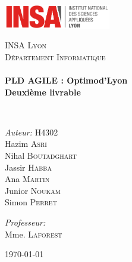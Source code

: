 \begin{titlepage}
\begin{center}

\includegraphics[width=0.35\textwidth]{./logo}~\\[2cm]

\vspace{3cm}

\textsc{\LARGE INSA Lyon}\\[0.5cm]
\textsc{\Large Département Informatique}\\[0.5cm]

\HRule \\[0.4cm]

{\huge \bfseries PLD AGILE : Optimod'Lyon\\
 Deuxième livrable\\[0.4cm] }

\HRule \\[1.5cm]

\begin{minipage}{0.4\textwidth}
\begin{flushleft} \large
\emph{Auteur:} H4302\\
Hazim \textsc{Asri}\\
Nihal \textsc{Boutadghart}\\
Jassir \textsc{Habba}\\
Ana \textsc{Martin}\\
Junior \textsc{Noukam}\\
Simon \textsc{Perret}\\
\end{flushleft}
\end{minipage}
\begin{minipage}{0.4\textwidth}
\begin{flushright} \large
\emph{Professeur:} \\
Mme. \textsc{Laforest}\\
\end{flushright}
\end{minipage}

\vfill

{\large \today}

\end{center}
\end{titlepage}